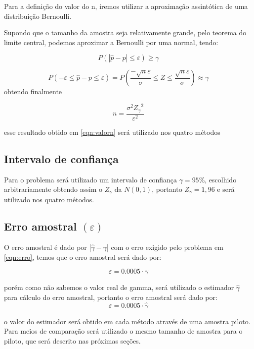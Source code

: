 \documentclass{article}
\begin{document}
Para a definição do valor do n, iremos utilizar a aproximação assintótica de uma distribuição Bernoulli.

Supondo que o tamanho da amostra seja relativamente grande, pelo teorema do limite central, podemos aproximar a Bernoulli por uma normal, tendo:

\[
P(|\hat{p} - p|\leq \varepsilon)\geq \gamma 
\] \cite{estatbas}

\[
P(-\varepsilon \leq \hat{p} - p \leq \varepsilon) = P\left( \frac{-\sqrt{n}\varepsilon}{\sigma} \leq Z \leq \frac{\sqrt{n}\varepsilon}{\sigma}\right) \approx \gamma
\]
obtendo finalmente 

\begin{equation}
    n = \frac {\sigma^2 {Z_\gamma}^2} {\varepsilon^2}
    \label{eqn:valorn}
\end{equation}

esse resultado obtido em \ref{eqn:valorn} será utilizado nos quatro métodos

\subsection{Intervalo de confiança}
Para o problema será utilizado um intervalo de confiança $\gamma = 95\%$, escolhido arbitrariamente obtendo assim o $Z_\gamma$ da $N(0,1)$, portanto $Z_\gamma = 1,96$ e será utilizado nos quatro métodos.

\subsection{Erro amostral $(\varepsilon)$}

O erro amostral é dado por $|\hat{\gamma}-{\gamma}|$ com o erro exigido pelo problema em \ref{eqn:erro}, temos que o erro amostral será dado por:

\begin{equation*}
    \varepsilon = 0.0005\cdot\gamma
\end{equation*}

porém como não sabemos o valor real de gamma, será utilizado o estimador $\hat{\gamma}$ para cálculo do erro amostral, portanto o erro amostral será dado por:
\begin{equation}
    \varepsilon = 0.0005\cdot\hat{\gamma}
    \label{eqn:erroamostral}
\end{equation}

o valor do estimador será obtido em cada método através de uma amostra piloto. Para meios de comparação será utilizado o mesmo tamanho de amostra para o piloto, que será descrito nas próximas seções. 
\end{document}
